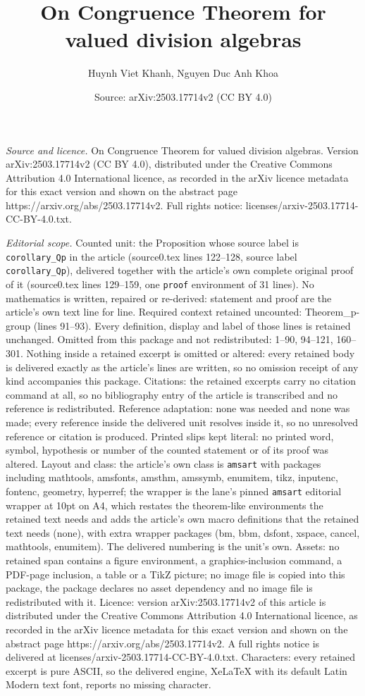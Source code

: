 \documentclass[10pt,a4paper]{amsart}
\title[On Congruence Theorem for valued division algebras]{On Congruence Theorem for valued division algebras}
\author{Huynh Viet Khanh, Nguyen Duc Anh Khoa}
\date{Source: arXiv:2503.17714v2 (CC BY 4.0)}
\begin{document}
\maketitle

\noindent\emph{Source and licence.} On Congruence Theorem for valued division algebras. Version arXiv:2503.17714v2 (CC BY 4.0), distributed under the Creative Commons Attribution 4.0 International licence, as recorded in the arXiv licence metadata for this exact version and shown on the abstract page https://arxiv.org/abs/2503.17714v2. Full rights notice: licenses/arxiv-2503.17714-CC-BY-4.0.txt.\par\smallskip

\noindent\textit{Editorial scope.} Counted unit: the Proposition whose source label is \texttt{corollary\_Qp} in the article (source0.tex lines 122--128, source label \texttt{corollary\_Qp}), delivered together with the article's own complete original proof of it (source0.tex lines 129--159, one \texttt{proof} environment of 31 lines). No mathematics is written, repaired or re-derived: statement and proof are the article's own text line for line. Required context retained uncounted: Theorem\_p-group (lines 91--93). Every definition, display and label of those lines is retained unchanged. Omitted from this package and not redistributed: 1--90, 94--121, 160--301. Nothing inside a retained excerpt is omitted or altered: every retained body is delivered exactly as the article's lines are written, so no omission receipt of any kind accompanies this package. Citations: the retained excerpts carry no citation command at all, so no bibliography entry of the article is transcribed and no reference is redistributed. Reference adaptation: none was needed and none was made; every reference inside the delivered unit resolves inside it, so no unresolved reference or citation is produced. Printed slips kept literal: no printed word, symbol, hypothesis or number of the counted statement or of its proof was altered. Layout and class: the article's own class is \texttt{amsart} with packages including mathtools, amsfonts, amsthm, amssymb, enumitem, tikz, inputenc, fontenc, geometry, hyperref; the wrapper is the lane's pinned \texttt{amsart} editorial wrapper at 10pt on A4, which restates the theorem-like environments the retained text needs and adds the article's own macro definitions that the retained text needs (none), with extra wrapper packages (bm, bbm, dsfont, xspace, cancel, mathtools, enumitem). The delivered numbering is the unit's own. Assets: no retained span contains a figure environment, a graphics-inclusion command, a PDF-page inclusion, a table or a TikZ picture; no image file is copied into this package, the package declares no asset dependency and no image file is redistributed with it. Licence: version arXiv:2503.17714v2 of this article is distributed under the Creative Commons Attribution 4.0 International licence, as recorded in the arXiv licence metadata for this exact version and shown on the abstract page https://arxiv.org/abs/2503.17714v2. A full rights notice is delivered at licenses/arxiv-2503.17714-CC-BY-4.0.txt. Characters: every retained excerpt is pure ASCII, so the delivered engine, XeLaTeX with its default Latin Modern text font, reports no missing character.
\end{document}
